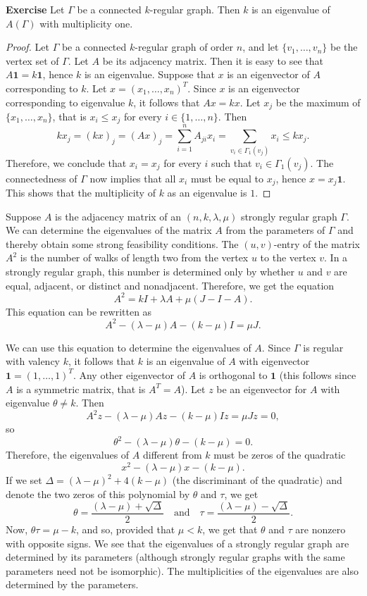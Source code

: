 \documentclass[12pt,a4paper,openany]{book}
\begin{document}
\bigskip\noindent\textbf{Exercise}
Let $\Gamma$ be a connected $k$-regular graph. Then $k$ is an eigenvalue of $A(\Gamma)$ with multiplicity one.


\begin{proof}
Let $\Gamma$ be a connected $k$-regular graph of order $n$, and let $\{v_1, \dots, v_n\}$ be the vertex set of $\Gamma$. Let $A$ be its adjacency matrix. Then it is easy to see that $A \mathbf{1} = k \mathbf{1}$, hence $k$ is an eigenvalue. Suppose that $x$ is an eigenvector of $A$ corresponding to $k$. Let $x = (x_1, \dots, x_n)^T$. Since $x$ is an eigenvector corresponding to eigenvalue $k$, it follows that $Ax = kx$. Let $x_j$ be the maximum of $\{x_1, \dots, x_n\}$, that is $x_i \leq x_j$ for every $i \in \{1, \dots, n\}$. Then
\[
k x_j = (k x)_j = (A x)_j = \sum_{i=1}^n A_{j i} x_i = \sum_{v_i \in \Gamma_1(v_j)} x_i \leq k x_j.
\]
Therefore, we conclude that $x_i = x_j$ for every $i$ such that $v_i \in \Gamma_1(v_j)$. The connectedness of $\Gamma$ now implies that all $x_i$ must be equal to $x_j$, hence $x = x_j \mathbf{1}$. This shows that the multiplicity of $k$ as an eigenvalue is $1$.
\end{proof}

Suppose $A$ is the adjacency matrix of an $(n, k, \lambda, \mu)$ strongly regular graph $\Gamma$. We can determine the eigenvalues of the matrix $A$ from the parameters of $\Gamma$ and thereby obtain some strong feasibility conditions. The $(u, v)$-entry of the matrix $A^2$ is the number of walks of length two from the vertex $u$ to the vertex $v$. In a strongly regular graph, this number is determined only by whether $u$ and $v$ are equal, adjacent, or distinct and nonadjacent. Therefore, we get the equation
\[
A^2 = k I + \lambda A + \mu (J - I - A).
\]
This equation can be rewritten as
\[
A^2 - (\lambda - \mu) A - (k - \mu) I = \mu J.
\]

We can use this equation to determine the eigenvalues of $A$. Since $\Gamma$ is regular with valency $k$, it follows that $k$ is an eigenvalue of $A$ with eigenvector $\mathbf{1} = (1, \dots, 1)^T$. Any other eigenvector of $A$ is orthogonal to $\mathbf{1}$ (this follows since $A$ is a symmetric matrix, that is $A^T = A$). Let $z$ be an eigenvector for $A$ with eigenvalue $\theta \neq k$. Then
\[
A^2 z - (\lambda - \mu) A z - (k - \mu) I z = \mu J z = 0,
\]
so
\[
\theta^2 - (\lambda - \mu) \theta - (k - \mu) = 0.
\]
Therefore, the eigenvalues of $A$ different from $k$ must be zeros of the quadratic
\[
x^2 - (\lambda - \mu) x - (k - \mu).
\]
If we set $\Delta = (\lambda - \mu)^2 + 4 (k - \mu)$ (the discriminant of the quadratic) and denote the two zeros of this polynomial by $\theta$ and $\tau$, we get
\[
\theta = \frac{(\lambda - \mu) + \sqrt{\Delta}}{2} \quad \text{and} \quad \tau = \frac{(\lambda - \mu) - \sqrt{\Delta}}{2}.
\]
Now, $\theta \tau = \mu - k$, and so, provided that $\mu < k$, we get that $\theta$ and $\tau$ are nonzero with opposite signs. We see that the eigenvalues of a strongly regular graph are determined by its parameters (although strongly regular graphs with the same parameters need not be isomorphic). The multiplicities of the eigenvalues are also determined by the parameters.
\end{document}
